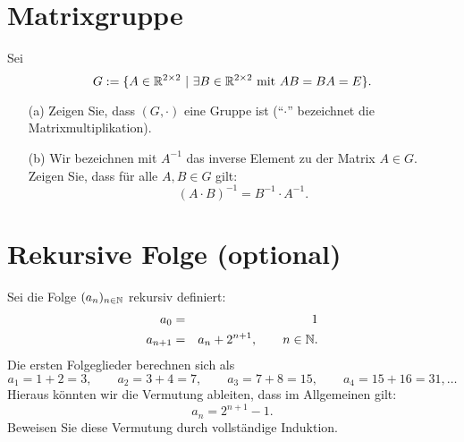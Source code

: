 \documentclass[
				a4paper,
				10pt
			]
			{scrartcl}
\begin{document}
\section{Matrixgruppe}

Sei 
$$
	G := \{ A \in \mathbb{R}^{2\times 2}~|~ \exists B \in \mathbb{R}^{2\times 2} \text{ mit } AB=BA=E \}.
$$

\begin{itemize}
	\item[(a)] Zeigen Sie, dass $(G,\cdot)$ eine Gruppe ist (``$\cdot$'' bezeichnet die Matrixmultiplikation).
	\item[(b)] Wir bezeichnen mit $A^{-1}$ das inverse Element zu der Matrix $A \in G$.\\[1mm] 
			Zeigen Sie, dass f\"ur alle $A,B \in G$ gilt:
			$$
				(A\cdot B)^{-1} = B^{-1}\cdot A^{-1}.
			$$
\end{itemize}

\section{Rekursive Folge (optional)}
Sei die Folge $(a_n)_{n\in \mathbb{N}}$ rekursiv definiert:
\begin{eqnarray*}
	a_0 		&=& 1\\
	a_{n+1}	&=& a_n + 2^{n+1}, \qquad n\in \mathbb{N}.
\end{eqnarray*}
Die ersten Folgeglieder berechnen sich als
$$
	a_1 = 1+2= 3, \qquad a_2 = 3+4= 7, \qquad a_3 = 7 + 8 =15,\qquad a_4 = 15 + 16 = 31, \ldots
$$
Hieraus k\"onnten wir die Vermutung ableiten, dass im Allgemeinen gilt:
$$
	a_n = 2^{n+1} - 1.
$$
Beweisen Sie diese Vermutung durch vollst\"andige Induktion.
\end{document}
